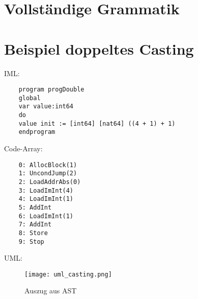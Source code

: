 \documentclass[10pt, a4paper, twocolumn]{article} %
\begin{document}
\clearpage
\appendix
\section{Vollständige Grammatik}

\clearpage
\section{Beispiel doppeltes Casting}
\label{bsp_casting}
IML:
\begin{lstlisting}
    program progDouble
    global
    var value:int64
    do
    value init := [int64] [nat64] ((4 + 1) + 1)
    endprogram
\end{lstlisting}

Code-Array:
\begin{lstlisting}
    0: AllocBlock(1)
    1: UncondJump(2)
    2: LoadAddrAbs(0)
    3: LoadImInt(4)
    4: LoadImInt(1)
    5: AddInt
    6: LoadImInt(1)
    7: AddInt
    8: Store
    9: Stop
\end{lstlisting}

UML:
\begin{figure}[H]
    \texttt{[image: uml\_casting.png]} %
    \caption{Auszug aus AST } %
    \label{casting}
\end{figure}


\end{document}

